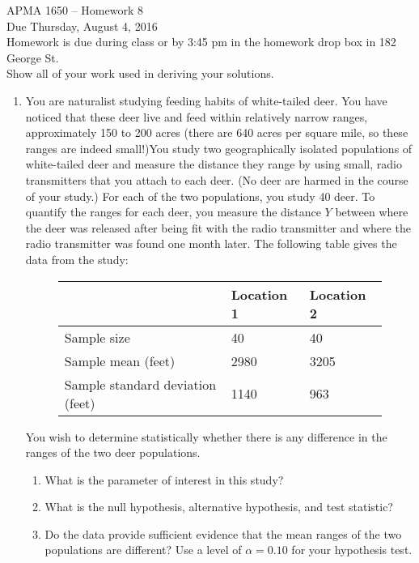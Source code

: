 \documentclass[12pt]{article}
\begin{document}
\title{}
\author{\vspace{-10ex} }

\begin{center}
{\LARGE APMA 1650 -- Homework 8}\\
\vspace{5mm}
{\large Due Thursday, August 4, 2016}\\
\vspace{5mm}
Homework is due during class or by 3:45 pm in the homework drop box in 182 George St.\\
Show all of your work used in deriving your solutions.
\end{center}

\begin{enumerate}

\item You are naturalist studying feeding habits of white-tailed deer. You have noticed that these deer live and feed within relatively narrow ranges, approximately 150 to 200 acres (there are 640 acres per square mile, so these ranges are indeed small!)You study two geographically isolated populations of white-tailed deer and measure the distance they range by using small, radio transmitters that you attach to each deer. (No deer are harmed in the course of your study.) For each of the two populations, you study 40 deer. To quantify the ranges for each deer, you measure the distance $Y$ between where the deer was released after being fit with the radio transmitter and where the radio transmitter was found one month later. The following table gives the data from the study:

\begin{figure}[H]
\centering
\begin{tabular}{l@{\hskip 2cm}l@{\hskip 2cm}l}
\toprule
& Location 1 & Location 2\\
\midrule
Sample size & 40 & 40 \\
Sample mean (feet) & 2980 & 3205 \\
Sample standard deviation (feet) & 1140 & 963 \\
\bottomrule
\end{tabular}
\end{figure}  

You wish to determine statistically whether there is any difference in the ranges of the two deer populations.
\begin{enumerate}
\item What is the parameter of interest in this study?
\item What is the null hypothesis, alternative hypothesis, and test statistic?
\item Do the data provide sufficient evidence that the mean ranges of the two populations are different? Use a level of $\alpha = 0.10$ for your hypothesis test.
\end{enumerate}


\end{enumerate}
\end{document}
